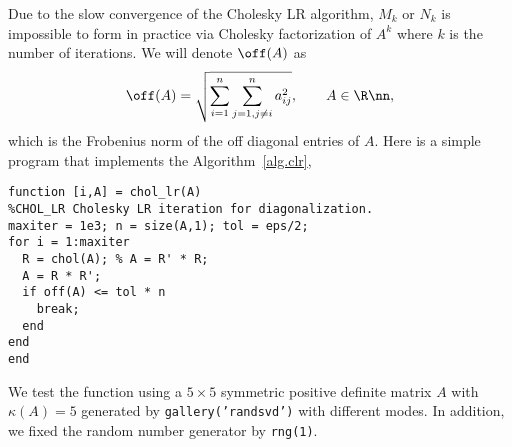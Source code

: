 Due to the slow convergence of the Cholesky LR algorithm,
$M_{k}$ or $N_{k}$ is impossible to form in practice via Cholesky
factorization of $A^{k}$ where $k$ is the number of iterations. 
We will denote $\off(A)$ as
\begin{equation}\notag
  \off(A) = \sqrt{\sum_{i = 1}^{n} \sum_{j = 1, j \neq i}^{n}
  a_{ij}^{2}},\qquad A \in \R\nn,
\end{equation}
which is the Frobenius norm of the off diagonal entries of $A$.
Here is a simple program that implements the Algorithm~\ref{alg.clr}, 
\begin{lstlisting}
function [i,A] = chol_lr(A)
%CHOL_LR Cholesky LR iteration for diagonalization.
maxiter = 1e3; n = size(A,1); tol = eps/2;
for i = 1:maxiter
  R = chol(A); % A = R' * R;
  A = R * R';
  if off(A) <= tol * n
    break;
  end
end 
end
\end{lstlisting}
We test the function using a $5\times 5$ symmetric positive definite matrix
$A$ with $\kappa(A) = 5$ generated by \texttt{gallery('randsvd')} with
different modes.
In addition, we fixed the random number generator by \texttt{rng(1)}.

